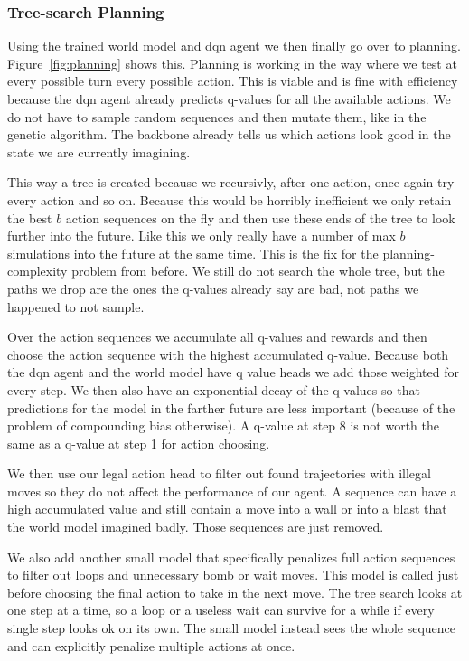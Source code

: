 \documentclass[article, 10pt]{IEEEtran}
\begin{document}
\subsubsection{Tree-search Planning}


Using the trained world model and dqn agent we then finally go over to planning. Figure~\ref{fig:planning} shows this. Planning is working in the way where we test at every possible turn every possible action. This is viable and is fine with efficiency because the dqn agent already predicts q-values for all the available actions. We do not have to sample random sequences and then mutate them, like in the genetic algorithm. The backbone already tells us which actions look good in the state we are currently imagining.

This way a tree is created because we recursivly, after one action, once again try every action and so on. Because this would be horribly inefficient we only retain the best $b$ action sequences on the fly and then use these ends of the tree to look further into the future. Like this we only really have a number of max $b$ simulations into the future at the same time. This is the fix for the planning-complexity problem from before. We still do not search the whole tree, but the paths we drop are the ones the q-values already say are bad, not paths we happened to not sample.

Over the action sequences we accumulate all q-values and rewards and then choose the action sequence with the highest accumulated q-value. Because both the dqn agent and the world model have q value heads we add those weighted for every step. We then also have an exponential decay of the q-values so that predictions for the model in the farther future are less important (because of the problem of compounding bias otherwise). A q-value at step 8 is not worth the same as a q-value at step 1 for action choosing.

We then use our legal action head to filter out found trajectories with illegal moves so they do not affect the performance of our agent. A sequence can have a high accumulated value and still contain a move into a wall or into a blast that the world model imagined badly. Those sequences are just removed.

We also add another small model that specifically penalizes full action sequences to filter out loops and unnecessary bomb or wait moves. This model is called just before choosing the final action to take in the next move. The tree search looks at one step at a time, so a loop or a useless wait can survive for a while if every single step looks ok on its own. The small model instead sees the whole sequence and can explicitly penalize multiple actions at once. 
\end{document}
